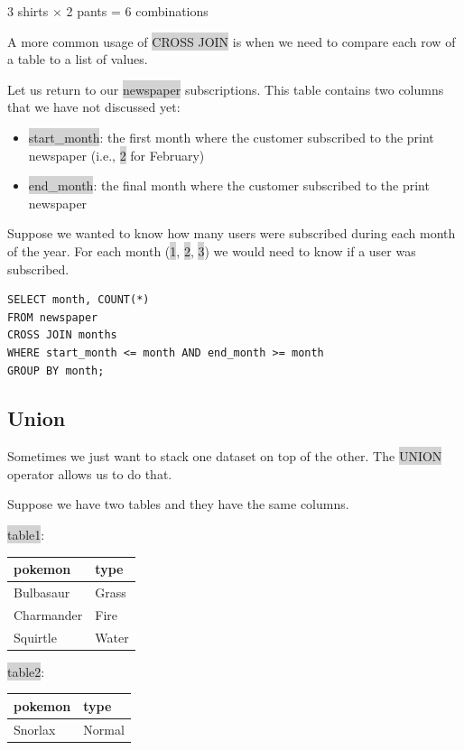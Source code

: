 \documentclass[11pt]{article}
\begin{document}
{{{{3 shirts $\times$ 2 pants = 6 combinations

A more common usage of \colorbox{lightgray}{CROSS JOIN} is when we need to compare each row of a table to a list of values.

Let us return to our \colorbox{lightgray}{newspaper} subscriptions. This table contains two columns that we have not discussed yet:
\begin{itemize}[leftmargin = *]
\item \colorbox{lightgray}{start\_month}: the first month where the customer subscribed to the print newspaper (i.e., \colorbox{lightgray}{2} for February)
\item \colorbox{lightgray}{end\_month}: the final month where the customer subscribed to the print newspaper
\end{itemize}
Suppose we wanted to know how many users were subscribed during each month of the year. For each month (\colorbox{lightgray}{1}, \colorbox{lightgray}{2}, \colorbox{lightgray}{3}) we would need to know if a user was subscribed. 
\begin{lstlisting}
SELECT month, COUNT(*)
FROM newspaper 
CROSS JOIN months 
WHERE start_month <= month AND end_month >= month 
GROUP BY month; 
\end{lstlisting}

\subsection{Union}
Sometimes we just want to stack one dataset on top of the other. The \colorbox{lightgray}{UNION} operator allows us to do that.

Suppose we have two tables and they have the same columns.

\colorbox{lightgray}{table1}:

{
\begin{tabular}{ | m{20em} | m{20em} |}
\hline
\textbf{pokemon} & \textbf{type} \\
\hline
Bulbasaur & Grass \\
\hline
Charmander & Fire\\
\hline 
Squirtle & Water\\
\hline
\end{tabular}

\colorbox{lightgray}{table2}:

{
\begin{tabular}{ | m{20em} | m{20em} |}
\hline
\textbf{pokemon} & \textbf{type} \\ 
\hline
Snorlax & Normal \\
\hline
\end{tabular}

}}}}}}
\end{document}

